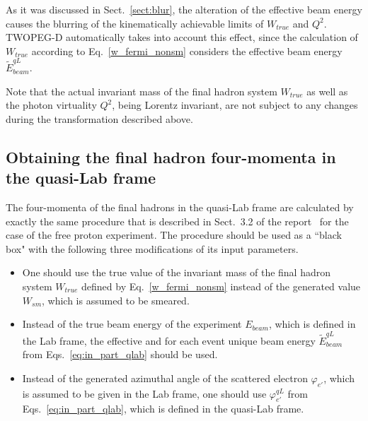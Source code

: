 As it was discussed in Sect.~\ref{sect:blur}, the alteration of the effective beam energy causes the blurring of the kinematically achievable limits of $W_{true}$ and $Q^2$. TWOPEG-D automatically takes into account this effect, since the calculation of $W_{true}$ according to Eq.~\eqref{w_fermi_nonsm} considers the effective beam energy $\widetilde{E}_{beam}^{qL}$.

Note that the actual invariant mass of the final hadron system $W_{true}$ as well as the photon virtuality $Q^{2}$, being Lorentz invariant, are not subject to any changes during the transformation described above.




\subsection{Obtaining the final hadron four-momenta in the quasi-Lab frame}

The four-momenta of the final hadrons in the quasi-Lab frame are calculated by exactly the same procedure that is described in Sect.~3.2 of the report~\cite{twopeg} for the case of the free proton experiment. 
The procedure should be used as a ``black box" with the following three modifications of its input parameters.

\begin{itemize}
\item One should use the true value of the invariant mass of the final hadron system $W_{true}$ defined by Eq.~\eqref{w_fermi_nonsm} instead of the generated value $W_{sm}$, which is assumed to be smeared.

\item Instead of the true beam energy of the experiment $E_{beam}$, which is defined in the Lab frame, the effective and for each event unique beam energy $\widetilde{E}_{beam}^{qL}$ from Eqs.~\eqref{eq:in_part_qlab} should be used. 

\item Instead of the generated azimuthal angle of the scattered electron $\varphi_{e'}$, which is assumed to be given in the Lab frame, one should use  $\varphi_{e'}^{qL}$ from Eqs.~\eqref{eq:in_part_qlab}, which is defined in the quasi-Lab frame.


\end{itemize}
 


